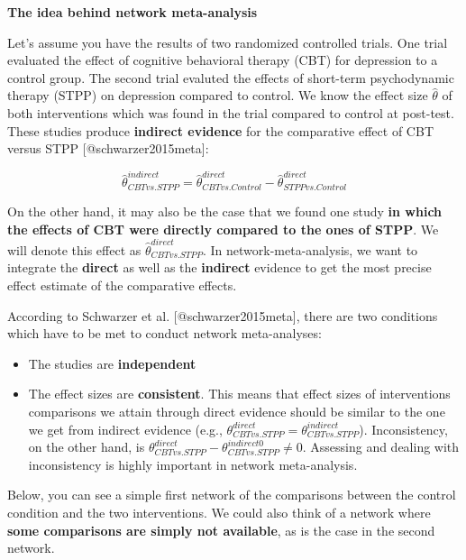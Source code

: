 \documentclass[]{book}
\providecommand{\tightlist}{%
  \setlength{\itemsep}{0pt}\setlength{\parskip}{0pt}}
\begin{document}
\begin{rmdinfo}
\textbf{The idea behind network meta-analysis}

Let's assume you have the results of two randomized controlled trials.
One trial evaluated the effect of cognitive behavioral therapy (CBT) for
depression to a control group. The second trial evaluted the effects of
short-term psychodynamic therapy (STPP) on depression compared to
control. We know the effect size \(\hat\theta\) of both interventions
which was found in the trial compared to control at post-test. These
studies produce \textbf{indirect evidence} for the comparative effect of
CBT versus STPP {[}@schwarzer2015meta{]}:

\[\hat\theta_{CBT vs. STPP}^{indirect}=\hat\theta_{CBT vs. Control}^{direct} -\hat\theta_{STPP vs.Control}^{direct} \]

On the other hand, it may also be the case that we found one study
\textbf{in which the effects of CBT were directly compared to the ones
of STPP}. We will denote this effect as
\(\hat\theta_{CBT vs. STPP}^{direct}\). In network-meta-analysis, we
want to integrate the \textbf{direct} as well as the \textbf{indirect}
evidence to get the most precise effect estimate of the comparative
effects.

According to Schwarzer et al. {[}@schwarzer2015meta{]}, there are two
conditions which have to be met to conduct network meta-analyses:

\begin{itemize}
\tightlist
\item
  The studies are \textbf{independent}
\item
  The effect sizes are \textbf{consistent}. This means that effect sizes
  of interventions comparisons we attain through direct evidence should
  be similar to the one we get from indirect evidence (e.g.,
  \(\theta_{CBT vs. STPP}^{direct}=\theta_{CBT vs. STPP}^{indirect}\)).
  Inconsistency, on the other hand, is
  \(\theta_{CBT vs. STPP}^{direct}-\theta_{CBT vs. STPP}^{indirect0} \not= 0\).
  Assessing and dealing with inconsistency is highly important in
  network meta-analysis.
\end{itemize}

Below, you can see a simple first network of the comparisons between the
control condition and the two interventions. We could also think of a
network where \textbf{some comparisons are simply not available}, as is
the case in the second network.
\end{rmdinfo}
\end{document}
